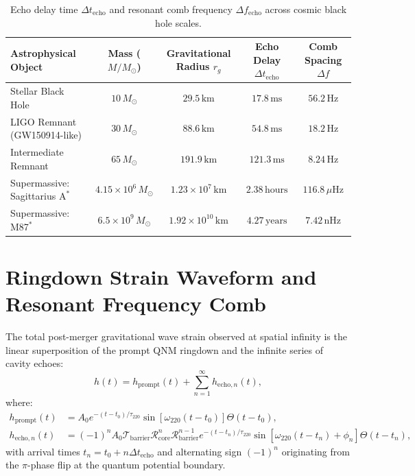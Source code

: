 \documentclass[11pt,a4paper]{article}
\begin{document}
\begin{table}[h!]
\centering
\caption{Echo delay time $\Delta t_{\mathrm{echo}}$ and resonant comb frequency $\Delta f_{\mathrm{echo}}$ across cosmic black hole scales.}
\begin{tabular}{lcccc}
\toprule
\textbf{Astrophysical Object} & \textbf{Mass ($M/M_\odot$)} & \textbf{Gravitational Radius $r_g$} & \textbf{Echo Delay $\Delta t_{\mathrm{echo}}$} & \textbf{Comb Spacing $\Delta f$} \\
\midrule
Stellar Black Hole & $10\,M_\odot$ & $29.5\,\mathrm{km}$ & $17.8\,\mathrm{ms}$ & $56.2\,\mathrm{Hz}$ \\
LIGO Remnant (GW150914-like) & $30\,M_\odot$ & $88.6\,\mathrm{km}$ & $54.8\,\mathrm{ms}$ & $18.2\,\mathrm{Hz}$ \\
Intermediate Remnant & $65\,M_\odot$ & $191.9\,\mathrm{km}$ & $121.3\,\mathrm{ms}$ & $8.24\,\mathrm{Hz}$ \\
Supermassive: Sagittarius $\mathrm{A}^*$ & $4.15 \times 10^6\,M_\odot$ & $1.23 \times 10^7\,\mathrm{km}$ & $2.38\,\mathrm{hours}$ & $116.8\,\mu\mathrm{Hz}$ \\
Supermassive: M87$^*$ & $6.5 \times 10^9\,M_\odot$ & $1.92 \times 10^{10}\,\mathrm{km}$ & $4.27\,\mathrm{years}$ & $7.42\,\mathrm{nHz}$ \\
\bottomrule
\end{tabular}
\label{tab:echo_values}
\end{table}

\section{Ringdown Strain Waveform and Resonant Frequency Comb}

The total post-merger gravitational wave strain observed at spatial infinity is the linear superposition of the prompt QNM ringdown and the infinite series of cavity echoes:
\begin{equation}
h(t) = h_{\mathrm{prompt}}(t) + \sum_{n=1}^{\infty} h_{\mathrm{echo}, n}(t),
\end{equation}
where:
\begin{align}
h_{\mathrm{prompt}}(t) &= A_0 e^{-(t - t_0)/\tau_{220}} \sin[\omega_{220} (t - t_0)] \Theta(t - t_0), \\
h_{\mathrm{echo}, n}(t) &= (-1)^n A_0 \mathcal{T}_{\mathrm{barrier}} \mathcal{R}_{\mathrm{core}}^n \mathcal{R}_{\mathrm{barrier}}^{n-1} e^{-(t - t_n)/\tau_{220}} \sin[\omega_{220} (t - t_n) + \phi_n] \Theta(t - t_n),
\end{align}
with arrival times $t_n = t_0 + n \Delta t_{\mathrm{echo}}$ and alternating sign $(-1)^n$ originating from the $\pi$-phase flip at the quantum potential boundary.
\end{document}
